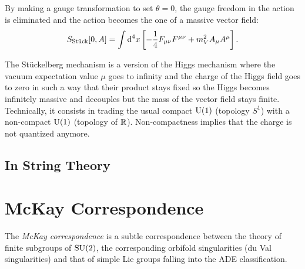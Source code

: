 \documentclass[a4paper,8pt]{article}
\begin{document}
        By making a gauge transformation to set $\theta=0$, the gauge freedom in the action is eliminated and the action becomes the one of a massive vector field:
        \begin{equation}
            S_{\text{Stück}}[0,A] = \int\text{d}^4x\left[ -\frac{1}{4}F_{\mu\nu}F^{\mu\nu}+m^2_VA_\mu A^\mu \right].
        \end{equation}

        \begin{result}
            The Stückelberg mechanism is a version of the Higgs mechanism where the vacuum expectation value $\mu$ goes to infinity and the charge of the Higgs field goes to zero in such a way that their product stays fixed so the Higgs becomes infinitely massive and decouples but the mass of the vector field stays finite. Technically, it consists in trading the usual compact $\text{U}(1)$ (topology $S^1$) with  a non-compact $\text{U}(1)$ (topology of $\mathbb{R}$). Non-compactness implies that the charge is not quantized anymore.
        \end{result}

    \subsection{In String Theory}

        

\section{McKay Correspondence}

    The \emph{McKay correspondence} is a subtle correspondence between the theory of finite subgroups of $\text{SU}(2)$, the corresponding orbifold singularities (du Val singularities) and that of simple Lie groups falling into the ADE classification.
\end{document}

